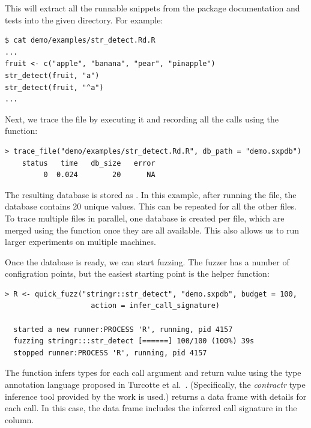 \documentclass[sigplan,nonacm,anonymous,review]{acmart}
\begin{document}
This will extract all the runnable snippets from the package documentation and tests into the given directory.
For example:

\begin{lstlisting}
$ cat demo/examples/str_detect.Rd.R
...
fruit <- c("apple", "banana", "pear", "pinapple")
str_detect(fruit, "a")
str_detect(fruit, "^a")
...
\end{lstlisting}

Next, we trace the file by executing it and recording all the calls using the  function:

\begin{lstlisting}
> trace_file("demo/examples/str_detect.Rd.R", db_path = "demo.sxpdb")
    status   time   db_size   error
         0  0.024        20      NA
\end{lstlisting}

The resulting database is stored as . 
In this example, after running the  file, the database contains 20 unique values. 
This can be repeated for all the other files. 
To trace multiple files in parallel, one database is created per file, which are merged using the  function once they are all available.
This also allows us to run larger experiments on multiple machines.

Once the database is ready, we can start fuzzing.
The fuzzer has a number of configration points, but the easiest starting point is the  helper function:

\begin{lstlisting}
> R <- quick_fuzz("stringr::str_detect", "demo.sxpdb", budget = 100, 
                    action = infer_call_signature)

  started a new runner:PROCESS 'R', running, pid 4157
  fuzzing stringr:::str_detect [======] 100/100 (100%) 39s
  stopped runner:PROCESS 'R', running, pid 4157
\end{lstlisting}

The  function infers types for each call argument and return value using the type annotation language proposed in Turcotte et al.~\cite{turcotte2020designing}.
(Specifically, the \emph{contractr} type inference tool provided by the work is used.)
 returns a data frame with details for each call.
In this case, the data frame includes the inferred call signature in the  column. %
\end{document}
